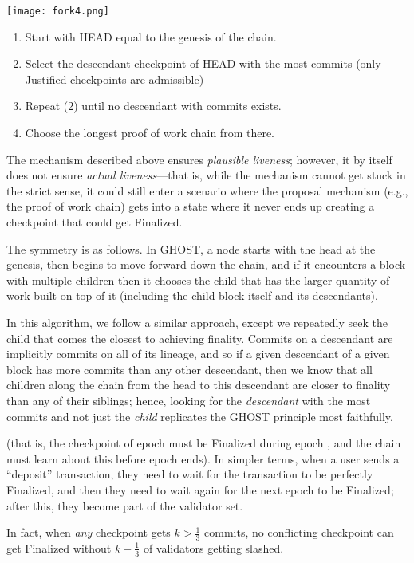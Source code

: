 \texttt{[image: fork4.png]}


\begin{enumerate}
\item Start with HEAD equal to the genesis of the chain.
\item Select the descendant checkpoint of HEAD with the most commits (only Justified checkpoints are admissible)
\item Repeat (2) until no descendant with commits exists.
\item Choose the longest proof of work chain from there.
\end{enumerate}


The mechanism described above ensures \textit{plausible liveness}; however, it by itself does not ensure \textit{actual liveness}---that is, while the mechanism cannot get stuck in the strict sense, it could still enter a scenario where the proposal mechanism (e.g., the proof of work chain) gets into a state where it never ends up creating a checkpoint that could get Finalized.


The symmetry is as follows. In GHOST, a node starts with the head at the genesis, then begins to move forward down the chain, and if it encounters a block with multiple children then it chooses the child that has the larger quantity of work built on top of it (including the child block itself and its descendants).

In this algorithm, we follow a similar approach, except we repeatedly seek the child that comes the closest to achieving finality. Commits on a descendant are implicitly commits on all of its lineage, and so if a given descendant of a given block has more commits than any other descendant, then we know that all children along the chain from the head to this descendant are closer to finality than any of their siblings; hence, looking for the \textit{descendant} with the most commits and not just the \textit{child} replicates the GHOST principle most faithfully. 

(that is, the checkpoint of epoch \epoch must be Finalized during epoch \epoch, and the chain must learn about this before epoch \epoch ends). In simpler terms, when a user sends a ``deposit'' transaction, they need to wait for the transaction to be perfectly Finalized, and then they need to wait again for the next epoch to be Finalized; after this, they become part of the validator set.

In fact, when \textit{any} checkpoint gets $k > \frac{1}{3}$ commits, no conflicting checkpoint can get Finalized without $k - \frac{1}{3}$ of validators getting slashed. 


